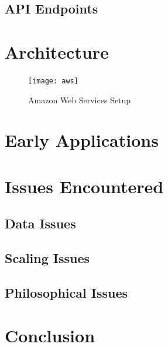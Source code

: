\documentclass[11pt]{article}
\begin{document}
\subsection{API Endpoints}
\section{Architecture}

\begin{figure}[h]
	\caption{Amazon Web Services Setup}
	\centering
	\texttt{[image: aws]}
\end{figure}


\section{Early Applications}

\section{Issues Encountered}

\subsection{Data Issues}

\subsection{Scaling Issues}

\subsection{Philosophical Issues}

\section{Conclusion}
\end{document}
